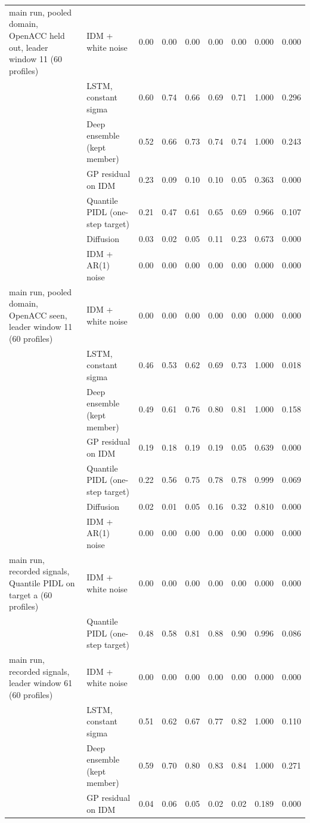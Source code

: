 \begin{longtable}{llrrrrrrr}
\midrule
main run, pooled domain, OpenACC held out, leader window 11 (60 profiles) & IDM + white noise & 0.00 & 0.00 & 0.00 & 0.00 & 0.00 & 0.000 & 0.000 \\
 & LSTM, constant sigma & 0.60 & 0.74 & 0.66 & 0.69 & 0.71 & 1.000 & 0.296 \\
 & Deep ensemble (kept member) & 0.52 & 0.66 & 0.73 & 0.74 & 0.74 & 1.000 & 0.243 \\
 & GP residual on IDM & 0.23 & 0.09 & 0.10 & 0.10 & 0.05 & 0.363 & 0.000 \\
 & Quantile PIDL (one-step target) & 0.21 & 0.47 & 0.61 & 0.65 & 0.69 & 0.966 & 0.107 \\
 & Diffusion & 0.03 & 0.02 & 0.05 & 0.11 & 0.23 & 0.673 & 0.000 \\
 & IDM + AR(1) noise & 0.00 & 0.00 & 0.00 & 0.00 & 0.00 & 0.000 & 0.000 \\
\midrule
main run, pooled domain, OpenACC seen, leader window 11 (60 profiles) & IDM + white noise & 0.00 & 0.00 & 0.00 & 0.00 & 0.00 & 0.000 & 0.000 \\
 & LSTM, constant sigma & 0.46 & 0.53 & 0.62 & 0.69 & 0.73 & 1.000 & 0.018 \\
 & Deep ensemble (kept member) & 0.49 & 0.61 & 0.76 & 0.80 & 0.81 & 1.000 & 0.158 \\
 & GP residual on IDM & 0.19 & 0.18 & 0.19 & 0.19 & 0.05 & 0.639 & 0.000 \\
 & Quantile PIDL (one-step target) & 0.22 & 0.56 & 0.75 & 0.78 & 0.78 & 0.999 & 0.069 \\
 & Diffusion & 0.02 & 0.01 & 0.05 & 0.16 & 0.32 & 0.810 & 0.000 \\
 & IDM + AR(1) noise & 0.00 & 0.00 & 0.00 & 0.00 & 0.00 & 0.000 & 0.000 \\
\midrule
main run, recorded signals, Quantile PIDL on target a (60 profiles) & IDM + white noise & 0.00 & 0.00 & 0.00 & 0.00 & 0.00 & 0.000 & 0.000 \\
 & Quantile PIDL (one-step target) & 0.48 & 0.58 & 0.81 & 0.88 & 0.90 & 0.996 & 0.086 \\
\midrule
main run, recorded signals, leader window 61 (60 profiles) & IDM + white noise & 0.00 & 0.00 & 0.00 & 0.00 & 0.00 & 0.000 & 0.000 \\
 & LSTM, constant sigma & 0.51 & 0.62 & 0.67 & 0.77 & 0.82 & 1.000 & 0.110 \\
 & Deep ensemble (kept member) & 0.59 & 0.70 & 0.80 & 0.83 & 0.84 & 1.000 & 0.271 \\
 & GP residual on IDM & 0.04 & 0.06 & 0.05 & 0.02 & 0.02 & 0.189 & 0.000 \\

\end{longtable}
